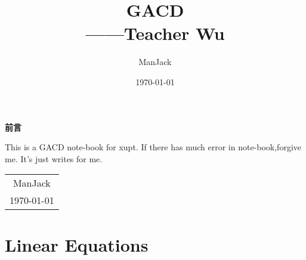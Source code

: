 \documentclass[11pt, a4paper, oneside, UTF8]{ctexbook}
\title{{\Huge{\textbf{GACD}}}\\------Teacher Wu}
\author{ManJack}
\date{\today}
\newtheorem[M]{theorem}{Theorem}[section]
\newtheorem[M]{lemma}[theorem]{Lemma}
\newtheorem[M]{definition}{Definition}[section]
\begin{document}
\maketitle

\setcounter{page}{1}

\newpage
\begin{center}
	\Huge\textbf{前言}
\end{center}

This is a GACD note-book for xupt. If there has much error in note-book,forgive me. It's just writes for me.

\begin{flushright}
	\begin{tabular}{c}
		ManJack \\
		\today
	\end{tabular}
\end{flushright}

\newpage
\tableofcontents
\newpage
{}
\setcounter{page}{1}

\chapter{Linear Equations}


\end{document}
